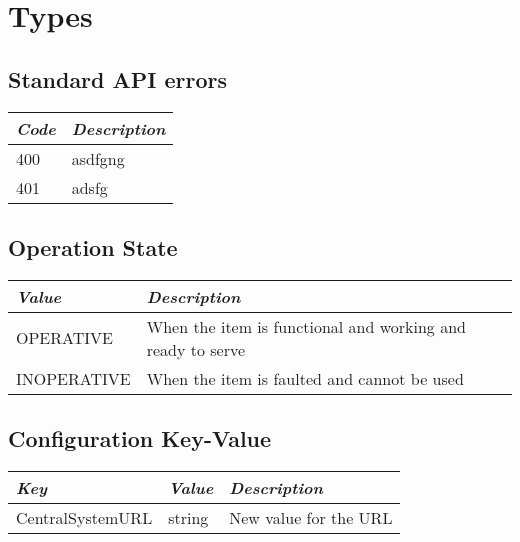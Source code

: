 \section{Types}

\subsection{Standard API errors}
\label{types:errors}

\begin{tabularx}{\linewidth}{ l X }
  \hline
  \textit{Code} & \textit{Description} \\
  \hline \hline
  400 		& asdfgng \\
  401 		& adsfg \\
\end{tabularx}


\subsection{Operation State}
\label{types:OperationState}

\begin{tabularx}{\linewidth}{ l X }
  \hline
  \textit{Value} & \textit{Description} \\
  \hline \hline
  OPERATIVE 		& When the item is functional and working and ready to serve \\
  INOPERATIVE 	& When the item is faulted and cannot be used \\
\end{tabularx}

\subsection{Configuration Key-Value}
\label{types:ConfigurationKeyValue}

\begin{tabularx}{\linewidth}{ l l X }
  \hline
  \textit{Key} & \textit{Value} &\textit{Description} \\
  \hline \hline
  CentralSystemURL 	& string 	& New value for the URL \\
\end{tabularx}